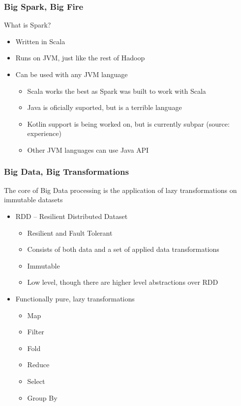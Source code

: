 \documentclass{beamer}
\begin{document}
\begin{frame}
\frametitle{Big Spark, Big Fire}
What is Spark?
\begin{itemize}
    \item Written in Scala
    \item Runs on JVM, just like the rest of Hadoop
    \item Can be used with any JVM language
        \begin{itemize}
            \item Scala works the best as Spark was built to work with Scala
            \item Java is oficially suported, but is a terrible language
            \item Kotlin support is being worked on, but is currently subpar (source: experience)
            \item Other JVM languages can use Java API
        \end{itemize}
\end{itemize}
\end{frame}

\begin{frame}
\frametitle{Big Data, Big Transformations}
The core of Big Data processing is the application of lazy transformations on immutable datasets
\begin{itemize}
    \item RDD -- Resilient Distributed Dataset
        \begin{itemize}
            \item Resilient and Fault Tolerant
            \item Consists of both data and a set of applied data transformations
            \item Immutable
            \item Low level, though there are higher level abstractions over RDD
        \end{itemize}
    \item Functionally pure, lazy transformations
        \begin{itemize}
            \item Map
            \item Filter
            \item Fold
            \item Reduce
            \item Select
            \item Group By
        \end{itemize}
\end{itemize}
\end{frame}
\end{document}
